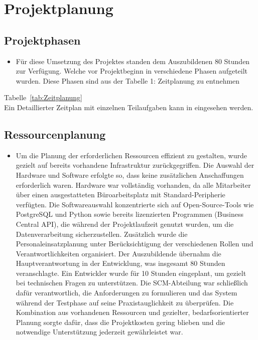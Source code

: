 \section{Projektplanung} 
\label{sec:Projektplanung}


\subsection{Projektphasen}
\label{sec:Projektphasen}

\begin{itemize}
	\item Für diese Umsetzung des Projektes standen dem Auszubildenen 80 Stunden zur Verfügung.
	Welche vor Projektbeginn in verschiedene Phasen aufgeteilt wurden. Diese Phasen sind aus der Tabelle 1: Zeitplanung zu entnehmen
\end{itemize}

Tabelle~\ref{tab:Zeitplanung}
\\
Ein Detaillierter Zeitplan mit einzelnen Teilaufgaben kann in  eingesehen werden.


\subsection{Ressourcenplanung}
\label{sec:Ressourcenplanung}

\begin{itemize}
	\item Um die Planung der erforderlichen Ressourcen effizient zu gestalten, wurde gezielt auf bereits vorhandene Infrastruktur zurückgegriffen. Die Auswahl der Hardware und Software erfolgte so, dass keine zusätzlichen Anschaffungen erforderlich waren. Hardware war vollständig vorhanden, da alle Mitarbeiter über einen ausgestatteten Büroarbeitsplatz mit Standard-Peripherie verfügten. Die Softwareauswahl konzentrierte sich auf Open-Source-Tools wie PostgreSQL und Python sowie bereits lizenzierten Programmen (Business Central API), die während der Projektlaufzeit genutzt wurden, um die Datenverarbeitung sicherzustellen. Zusätzlich wurde die Personaleinsatzplanung unter Berücksichtigung der verschiedenen Rollen und Verantwortlichkeiten organisiert. Der Auszubildende übernahm die Hauptverantwortung in der Entwicklung, was insgesamt 80 Stunden veranschlagte. Ein Entwickler wurde für 10 Stunden eingeplant, um gezielt bei technischen Fragen zu unterstützen. Die SCM-Abteilung war schließlich dafür verantwortlich, die Anforderungen zu formulieren und das System während der Testphase auf seine Praxistauglichkeit zu überprüfen. Die Kombination aus vorhandenen Ressourcen und gezielter, bedarfsorientierter Planung sorgte dafür, dass die Projektkosten gering blieben und die notwendige Unterstützung jederzeit gewährleistet war.
\end{itemize}


